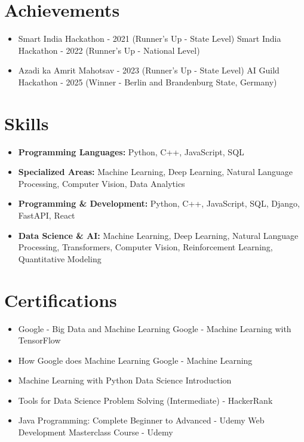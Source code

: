 \documentclass[a4paper,10pt]{article}
\begin{document}
\section*{Achievements}
\begin{itemize}
\item Smart India Hackathon - 2021 (Runner's Up - State Level) \hfill Smart India Hackathon - 2022 (Runner's Up - National Level)
\item Azadi ka Amrit Mahotsav - 2023 (Runner's Up - State Level) \hfill AI Guild Hackathon - 2025 (Winner - Berlin and Brandenburg State, Germany)
\end{itemize}

\section*{Skills}
\begin{itemize}
  \item \textbf{Programming Languages:} Python, C++, JavaScript, SQL
  \item \textbf{Specialized Areas:} Machine Learning, Deep Learning, Natural Language Processing, Computer Vision, Data Analytics
  \item \textbf{Programming \& Development:} Python, C++, JavaScript, SQL, Django, FastAPI, React
  \item \textbf{Data Science \& AI:} Machine Learning, Deep Learning, Natural Language Processing, Transformers, Computer Vision, Reinforcement Learning, Quantitative Modeling
\end{itemize}

\section*{Certifications}
\begin{itemize}
\item Google - Big Data and Machine Learning \hfill Google - Machine Learning with TensorFlow
\item How Google does Machine Learning \hfill Google - Machine Learning
\item Machine Learning with Python \hfill Data Science Introduction
\item Tools for Data Science \hfill Problem Solving (Intermediate) - HackerRank
\item Java Programming: Complete Beginner to Advanced - Udemy \hfill Web Development Masterclass Course - Udemy
\end{itemize}
\end{document}
